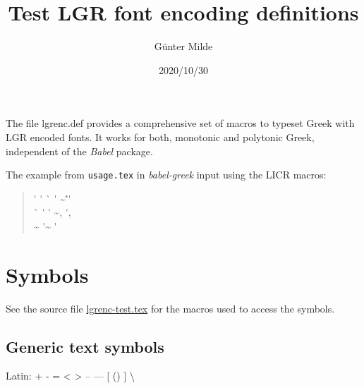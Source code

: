 \documentclass{article}
\newcommand{\LGR}{\fontencoding{LGR}\selectfont}
\begin{document}
\title{Test LGR font encoding definitions}
\author{Günter Milde}
\date{2020/10/30}
\maketitle

The file lgrenc.def provides a comprehensive set of macros to typeset Greek
with LGR encoded fonts. It works for both, monotonic and polytonic Greek,
independent of the \emph{Babel} package.

The example from \texttt{usage.tex} in \emph{babel-greek} input
using the LICR macros:

\begin{quote}
  \LGR
  \textTau\'\textiota{}
  \textphi\'\texteta\textiota\textfinalsigma\texterotimatiko{}
  \<\textIota\textdelta\`\textomega\textnu{}
  \>\textepsilon\textnu\texttheta\'\textepsilon\textdelta\textepsilon{}
  \textpi\textalpha\~\textiota\textdelta\'\'
  \>\textepsilon\textlambda\textepsilon\textupsilon\texttheta\'\textepsilon\textrho\textalpha\textnu\\
  \texttau\`\textalpha\textfinalsigma{}
  \textpi\textlambda\texteta\textautosigma\'\textiota\textomicron\textnu{}
  \textNu\'\textupsilon\textmu\textphi\textalpha\textfinalsigma{}
  \textautosigma\texttau\textepsilon\textphi\textalpha\textnu\textomicron\~\textupsilon\textautosigma\textalpha\textnu{},
  \textSigma\'\textomega\textautosigma\texttau\textrho\textalpha\texttau\textepsilon{},\\
  \>\textepsilon\textrho\~\textomega\textnu{}
  \'\textalpha\textpi\~\texteta\textlambda\texttheta\textepsilon\textfinalsigma{}
  \textepsilon\>\textupsilon\texttheta\'\textupsilon\textfinalsigma\texterotimatiko{}

\end{quote}

\section{Symbols}

See the source file \href{lgrenc-test.tex}{lgrenc-test.tex} for the macros
used to access the symbols.

\subsection{Generic text symbols}

Latin:
+ - = < > -- --- [ () ]
%
\textbraceleft{}
\textbraceright{}
\textbackslash{}
\textbar{}
\textperthousand{}
\textpertenthousand{}
\textvisiblespace{}
\end{document}

